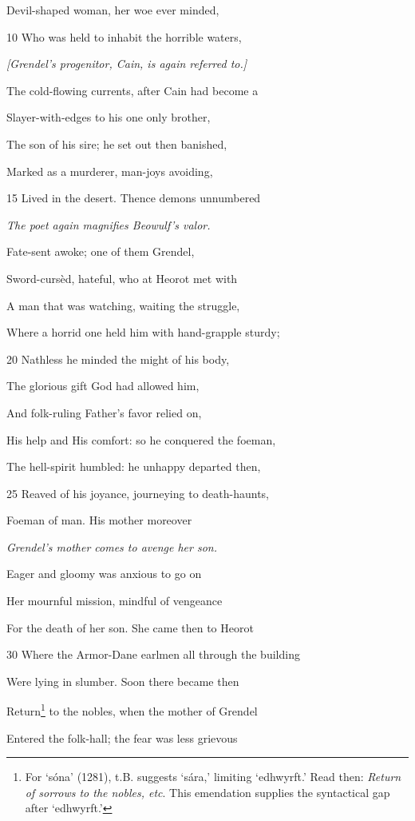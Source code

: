 Devil-shaped woman, her woe ever minded,

10
Who was held to inhabit the horrible waters,

\emph{[Grendel’s progenitor,
Cain, is again
referred to.]}

The cold-flowing currents, after Cain had become a

Slayer-with-edges to his one only brother,

The son of his sire; he set out then banished,

Marked as a murderer, man-joys avoiding,

15
Lived in the desert. Thence demons unnumbered

\emph{The poet again
magnifies Beowulf’s
valor.}

Fate-sent awoke; one of them Grendel,

Sword-cursèd, hateful, who at Heorot met with

A man that was watching, waiting the struggle,

Where a horrid one held him with hand-grapple sturdy;

20
Nathless he minded the might of his body,

The glorious gift God had allowed him,

And folk-ruling Father’s favor relied on,

His help and His comfort: so he conquered the foeman,

The hell-spirit humbled: he unhappy departed then,

25
Reaved of his joyance, journeying to death-haunts,

Foeman of man. His mother moreover

\emph{Grendel’s mother
comes to avenge
her son.}

Eager and gloomy was anxious to go on

Her mournful mission, mindful of vengeance

For the death of her son. She came then to Heorot

30
Where the Armor-Dane earlmen all through the building

Were lying in slumber. Soon there became then

Return\footnote{For ‘sóna’ (1281), t.B. suggests ‘sára,’ limiting ‘edhwyrft.’ Read then:
\emph{Return of sorrows to the nobles, etc}. This emendation supplies the syntactical
gap after ‘edhwyrft.’} to the nobles, when the mother of Grendel

Entered the folk-hall; the fear was less grievous

